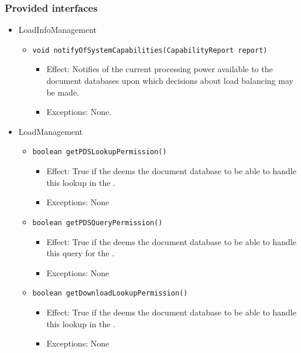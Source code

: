 \subsubsection*{Provided interfaces}
\begin{itemize}
    \item LoadInfoManagement
    \begin{itemize}
        \item \texttt{void notifyOfSystemCapabilities(CapabilityReport report)}
        \begin{itemize}
            \item Effect: Notifies of the current processing power available to the document databases upon which decisions about load balancing may be made.
            \item Exceptions: None.
        \end{itemize}
    \end{itemize}

    \item LoadManagement
    \begin{itemize}
        \item \texttt{boolean getPDSLookupPermission()}
        \begin{itemize}
            \item Effect: True if the  deems the document database to be able to handle this lookup in the .
            \item Exceptions: None
        \end{itemize}

		\item \texttt{boolean getPDSQueryPermission()}
        \begin{itemize}
            \item Effect: True if the  deems the document database to be able to handle this query for the .
            \item Exceptions: None
        \end{itemize}

		\item \texttt{boolean getDownloadLookupPermission()}
        \begin{itemize}
            \item Effect: True if the  deems the document database to be able to handle this lookup in the .
            \item Exceptions: None
        \end{itemize}
    \end{itemize}
\end{itemize}

